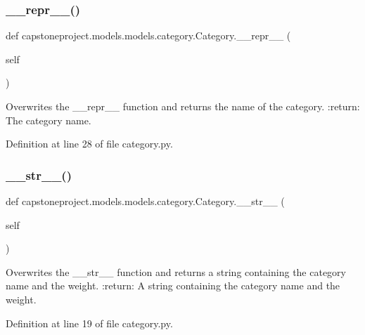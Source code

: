 \subsubsection{\texorpdfstring{\+\_\+\+\_\+repr\+\_\+\+\_\+()}{\_\_repr\_\_()}}
{\footnotesize\ttfamily def capstoneproject.\+models.\+models.\+category.\+Category.\+\_\+\+\_\+repr\+\_\+\+\_\+ (\begin{DoxyParamCaption}\item[{}]{self }\end{DoxyParamCaption})}

\begin{DoxyVerb}Overwrites the __repr__ function and returns the name of the category.
:return: The category name.
\end{DoxyVerb}
 

Definition at line 28 of file category.\+py.

\mbox{\label{classcapstoneproject_1_1models_1_1models_1_1category_1_1_category_ac82aee120190ed17cbe05a413a1dda24}} 
\subsubsection{\texorpdfstring{\+\_\+\+\_\+str\+\_\+\+\_\+()}{\_\_str\_\_()}}
{\footnotesize\ttfamily def capstoneproject.\+models.\+models.\+category.\+Category.\+\_\+\+\_\+str\+\_\+\+\_\+ (\begin{DoxyParamCaption}\item[{}]{self }\end{DoxyParamCaption})}

\begin{DoxyVerb}Overwrites the __str__ function and returns a string containing the
category name and the weight.
:return: A string containing the category name and the weight.
\end{DoxyVerb}
 

Definition at line 19 of file category.\+py.

\mbox{\label{classcapstoneproject_1_1models_1_1models_1_1category_1_1_category_a9e49b76788e6c3a4d1a85e9c3449cb6b}} 
